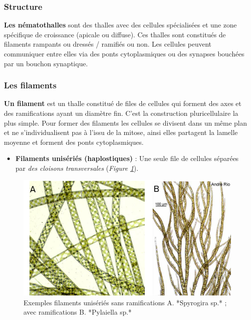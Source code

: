 \documentclass[
]{book}
\providecommand{\tightlist}{%
  \setlength{\itemsep}{0pt}\setlength{\parskip}{0pt}}
\begin{document}
\hypertarget{structure}{%
\subsubsection{Structure}\label{structure}}

\textbf{Les nématothalles} sont des thalles avec des cellules spécialisées et une zone spécifique de croissance (apicale ou diffuse). Ces thalles sont constitués de filaments rampants ou dressés / ramifiés ou non. Les cellules peuvent communiquer entre elles via des ponts cytoplasmiques ou des synapses bouchées par un bouchon synaptique.

\hypertarget{les-filaments}{%
\subsubsection{Les filaments}\label{les-filaments}}

\textbf{Un filament} est un thalle constitué de files de cellules qui forment des axes et des ramifications ayant un diamètre fin. C'est la construction pluricellulaire la plus simple. Pour former des filaments les cellules se divisent dans un même plan et ne s'individualisent pas à l'issu de la mitose, ainsi elles partagent la lamelle moyenne et forment des ponts cytoplasmiques.

\begin{itemize}
\tightlist
\item
  \textbf{Filaments unisériés (haplostiques)} : Une seule file de cellules séparées par \emph{des cloisons transversales} (\emph{Figure \ref{fig:haplostique}}).
\end{itemize}

\begin{figure}[H]

{\centering \includegraphics[width=0.7\linewidth]{./images/haplostique} 

}

\caption{Exemples filaments unisériés sans ramifications A. *Spyrogira  sp.* ; avec ramifications B. *Pylaiella sp.*}\label{fig:haplostique}
\end{figure}
\end{document}
